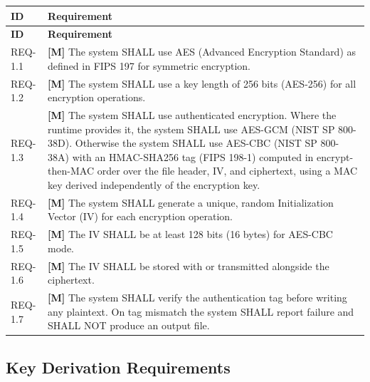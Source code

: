 \documentclass[11pt,letterpaper]{article}
\begin{document}
\begin{longtable}{@{}p{1.2cm}p{12cm}@{}}
\toprule
\textbf{ID} & \textbf{Requirement} \\
\midrule
\endfirsthead
\toprule
\textbf{ID} & \textbf{Requirement} \\
\midrule
\endhead

REQ-1.1 & \textcolor{mandatory}{\textbf{[M]}} The system SHALL use AES (Advanced Encryption Standard) as defined in FIPS 197 for symmetric encryption. \\[6pt]

REQ-1.2 & \textcolor{mandatory}{\textbf{[M]}} The system SHALL use a key length of 256 bits (AES-256) for all encryption operations. \\[6pt]

REQ-1.3 & \textcolor{mandatory}{\textbf{[M]}} The system SHALL use authenticated encryption. Where the runtime provides it, the system SHALL use AES-GCM (NIST SP 800-38D). Otherwise the system SHALL use AES-CBC (NIST SP 800-38A) with an HMAC-SHA256 tag (FIPS 198-1) computed in encrypt-then-MAC order over the file header, IV, and ciphertext, using a MAC key derived independently of the encryption key. \\[6pt]

REQ-1.4 & \textcolor{mandatory}{\textbf{[M]}} The system SHALL generate a unique, random Initialization Vector (IV) for each encryption operation. \\[6pt]

REQ-1.5 & \textcolor{mandatory}{\textbf{[M]}} The IV SHALL be at least 128 bits (16 bytes) for AES-CBC mode. \\[6pt]

REQ-1.6 & \textcolor{mandatory}{\textbf{[M]}} The IV SHALL be stored with or transmitted alongside the ciphertext. \\[6pt]

REQ-1.7 & \textcolor{mandatory}{\textbf{[M]}} The system SHALL verify the authentication tag before writing any plaintext. On tag mismatch the system SHALL report failure and SHALL NOT produce an output file. \\[6pt]

\bottomrule
\end{longtable}

\subsection{Key Derivation Requirements}
\end{document}
